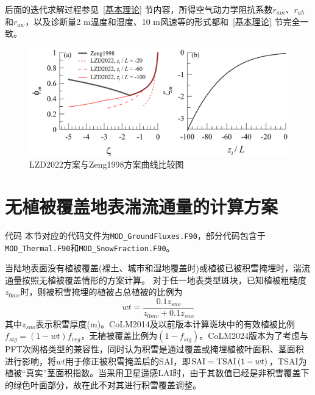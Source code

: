 后面的迭代求解过程参见~\ref{基本理论} 节内容，所得空气动力学阻抗系数$r_{am}$、$r_{ah}$和$r_{aw}$，以及诊断量2 m温度和湿度、10 m风速等的形式都和~\ref{基本理论} 节完全一致。
{
\begin{figure}[htbp]
\centering
\includegraphics[scale=0.7]{Figures/地表湍流交换过程/LZD2022方案与Zeng1998方案曲线比较图.png}
\caption{LZD2022方案与Zeng1998方案曲线比较图}
\label{fig:LZD2022方案与Zeng1998方案曲线比较图}
\end{figure}
}


\section{无植被覆盖地表湍流通量的计算方案}\label{无植被覆盖地表湍流通量的计算方案}
\begin{mymdframed}{代码}
本节对应的代码文件为\texttt{MOD\_GroundFluxes.F90}，部分代码包含于\texttt{MOD\_Thermal.F90}和\texttt{MOD\_SnowFraction.F90}。
\end{mymdframed}

当陆地表面没有植被覆盖(裸土、城市和湿地覆盖时)或植被已被积雪掩埋时，湍流通量按照无植被覆盖情形的方案计算。
对于任一地表类型斑块，已知植被粗糙度$z_{0mv}$时，则被积雪掩埋的植被占总植被的比例为
\begin{equation}
wt=\frac{0.1 z_{{sno}}}{z_{0mv}+0.1 z_{{sno}}}
\end{equation}
其中$z_{sno}$表示积雪厚度(m)。CoLM2014及以前版本计算斑块中的有效植被比例$f_{sig}=\left(1-wt\right)f_{veg}$，无植被覆盖比例为$\left(1-f_{sig}\right)$。CoLM2024版本为了考虑与PFT次网格类型的兼容性，同时认为积雪是通过覆盖或掩埋植被叶面积、茎面积进行影响，将$wt$用于修正被积雪掩盖后的SAI，即${\rm SAI=TSAI}\left(1-wt\right)$，TSAI为植被“真实”茎面积指数。当采用卫星遥感LAI时，由于其数值已经是非积雪覆盖下的绿色叶面部分，故在此不对其进行积雪覆盖调整。


